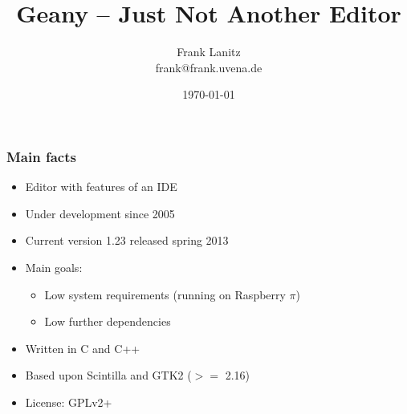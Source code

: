 \documentclass[compress]{beamer}
\title{Geany -- Just Not Another Editor}
\author{Frank Lanitz \\ frank@frank.uvena.de}
\date{\today}
\begin{document}
	\maketitle{}
	
	\begin{frame}
		\frametitle{Main facts}
		\begin{itemize}
			\item Editor with features of an IDE
			\item Under development since 2005
			\item Current version 1.23 released spring 2013
			\item Main goals: 
				\begin{itemize}
					\item Low system requirements (running on Raspberry $\pi$){}
					\item Low further dependencies
				\end{itemize}
			\item Written in C and C++
			\item Based upon Scintilla and GTK2 ($>=$ 2.16)
			\item License: GPLv2+
		\end{itemize}
	\end{frame}
\end{document}
